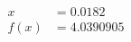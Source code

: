\documentclass[preview]{standalone}
\begin{document}
\begin{align*}
x &= 0.0182\\f(x) &= 4.0390905
\end{align*}
\end{document}
